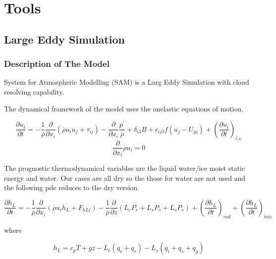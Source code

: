 
\chapter{Tools}
\label{ch:methods}

\section{Large Eddy Simulation}
\label{sec:LargeEddieSimulation}
\subsection{Description of The Model}
System for Atmospheric Modelling (SAM) is a Larg Eddy Simulation with cloud resolving capability.

The dynamical framework of the model uses the anelastic equations of motion.

\begin{equation}
\frac{\partial u_{i}}{\partial t} = -\frac{1}{\overline{\rho}}\frac{\partial}{\partial x_{i}}(\overline{\rho}u_{i}u_{j} + \tau_{ij}) - \frac{\partial}{\partial x_{i}}\frac{p^{'}}{\overline{\rho}} + \delta_{i3}B + \epsilon_{ij3}f(u_{j} - U_{gj}) + \left( \frac{\partial u_{i}}{\partial t} \right)_{l.s.}
\end{equation}
\begin{equation}
\frac{\partial}{\partial x_{i}}\overline{\rho}u_{i}=0
\end{equation}

The prognostic thermodynamical variables are the liquid water/ice moist static energy and water.  Our cases are all dry so the
those for water are not used and the following pde reduces to the dry version.

\begin{equation}
\frac{\partial h_{L}}{\partial t} = -\frac{1}{\overline{\rho}}\frac{\partial}{\partial x_{i}}(\overline{\rho} u_{i}h_{L} + F_{hLi}) - \frac{1}{\overline{\rho}}\frac{\partial}{\partial z}(L_{c}P_{r} + L_{s}P_{s} + L_{s}P_{s}) + \left( \frac{\partial h_{L}}{\partial t} \right)_{rad} + \left( \frac{\partial h_{L}}{\partial t} \right)_{mic}
\end{equation}

where

\begin{equation}
h_{L} = c_{p}T + gz - L_{c}(q_{c} + q_{r}) - L_{s}(q_{i} + q_{s} + q_{g})
\end{equation}

